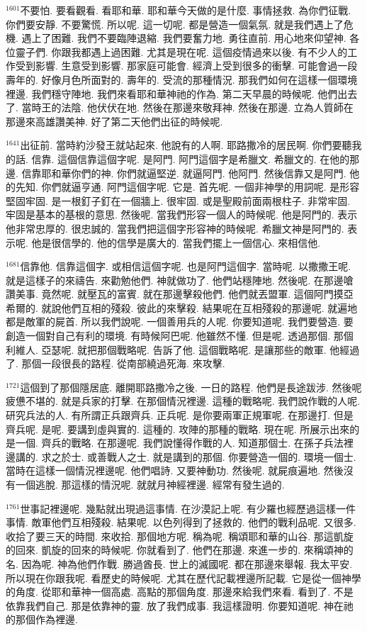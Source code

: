 \documentclass{book}
\begin{document}
$^{1601}$不要怕.
要看觀看.
看耶和華.
耶和華今天做的是什麼.
事情拯救.
為你們征戰.
你們要安靜.
不要驚慌.
所以呢.
這一切呢.
都是營造一個氣氛.
就是我們遇上了危機.
遇上了困難.
我們不要臨陣退縮.
我們要奮力地.
勇往直前.
用心地來仰望神.
各位靈子們.
你跟我都遇上過困難.
尤其是現在呢.
這個疫情過來以後.
有不少人的工作受到影響.
生意受到影響.
那家庭可能會.
經濟上受到很多的衝擊.
可能會過一段壽年的.
好像月色所面對的.
壽年的.
受流的那種情況.
那我們如何在這樣一個環境裡邊.
我們穩守陣地.
我們來看耶和華神祂的作為.
第二天早晨的時候呢.
他們出去了.
當時王的法陰.
他伏伏在地.
然後在那邊來敬拜神.
然後在那邊.
立為人質師在那邊來高雄讚美神.
好了第二天他們出征的時候呢.

$^{1641}$出征前.
當時約沙發王就站起來.
他說有的人啊.
耶路撒冷的居民啊.
你們要聽我的話.
信靠.
這個信靠這個字呢.
是阿門.
阿門這個字是希臘文.
希臘文的.
在他的那邊.
信靠耶和華你們的神.
你們就逼堅逆.
就逼阿門.
他阿門.
然後信靠又是阿門.
他的先知.
你們就逼亨通.
阿門這個字呢.
它是.
首先呢.
一個非神學的用詞呢.
是形容堅固牢固.
是一根釘子釘在一個牆上.
很牢固.
或是聖殿前面兩根柱子.
非常牢固.
牢固是基本的基根的意思.
然後呢.
當我們形容一個人的時候呢.
他是阿門的.
表示他非常忠厚的.
很忠誠的.
當我們把這個字形容神的時候呢.
希臘文神是阿門的.
表示呢.
他是很信學的.
他的信學是廣大的.
當我們擺上一個信心.
來相信他.

$^{1681}$信靠他.
信靠這個字.
或相信這個字呢.
也是阿門這個字.
當時呢.
以撒撒王呢.
就是這樣子的來禱告.
來勸勉他們.
神就做功了.
他們站穩陣地.
然後呢.
在那邊嗆讚美事.
竟然呢.
就壓瓦的富賓.
就在那邊擊殺他們.
他們就丟盟軍.
這個阿門摸亞希爾的.
就說他們互相的殘殺.
彼此的來擊殺.
結果呢在互相殘殺的那邊呢.
就遍地都是敵軍的屍首.
所以我們說呢.
一個善用兵的人呢.
你要知道呢.
我們要營造.
要創造一個對自己有利的環境.
有時候阿巴呢.
他雖然不懂.
但是呢.
透過那個.
那個利維人.
亞瑟呢.
就把那個戰略呢.
告訴了他.
這個戰略呢.
是讓那些的敵軍.
他經過了.
那個一段很長的路程.
從南部繞過死海.
來攻擊.

$^{1721}$這個到了那個隱居底.
離開耶路撒冷之後.
一日的路程.
他們是長途跋涉.
然後呢疲憊不堪的.
就是兵家的打擊.
在那個情況裡邊.
這種的戰略呢.
我們說作戰的人呢.
研究兵法的人.
有所謂正兵跟齊兵.
正兵呢.
是你要兩軍正規軍呢.
在那邊打.
但是齊兵呢.
是呢.
要講到虛與實的.
這種的.
攻陣的那種的戰略.
現在呢.
所展示出來的是一個.
齊兵的戰略.
在那邊呢.
我們說懂得作戰的人.
知道那個士.
在孫子兵法裡邊講的.
求之於士.
或善戰人之士.
就是講到的那個.
你要營造一個的.
環境一個士.
當時在這樣一個情況裡邊呢.
他們唱詩.
又要神動功.
然後呢.
就屍痕遍地.
然後沒有一個逃脫.
那這樣的情況呢.
就就月神經裡邊.
經常有發生過的.

$^{1761}$世事記裡邊呢.
幾點就出現過這事情.
在沙漠記上呢.
有少羅也經歷過這樣一件事情.
敵軍他們互相殘殺.
結果呢.
以色列得到了拯救的.
他們的戰利品呢.
又很多.
收拾了要三天的時間.
來收拾.
那個地方呢.
稱為呢.
稱頌耶和華的山谷.
那這凱旋的回來.
凱旋的回來的時候呢.
你就看到了.
他們在那邊.
來進一步的.
來稱頌神的名.
因為呢.
神為他們作戰.
勝過酋長.
世上的滅國呢.
都在那邊來舉報.
我太平安.
所以現在你跟我呢.
看歷史的時候呢.
尤其在歷代記載裡邊所記載.
它是從一個神學的角度.
從耶和華神一個高處.
高點的那個角度.
那邊來給我們來看.
看到了.
不是依靠我們自己.
那是依靠神的靈.
放了我們成事.
我這樣證明.
你要知道呢.
神在祂的那個作為裡邊.
\end{document}
